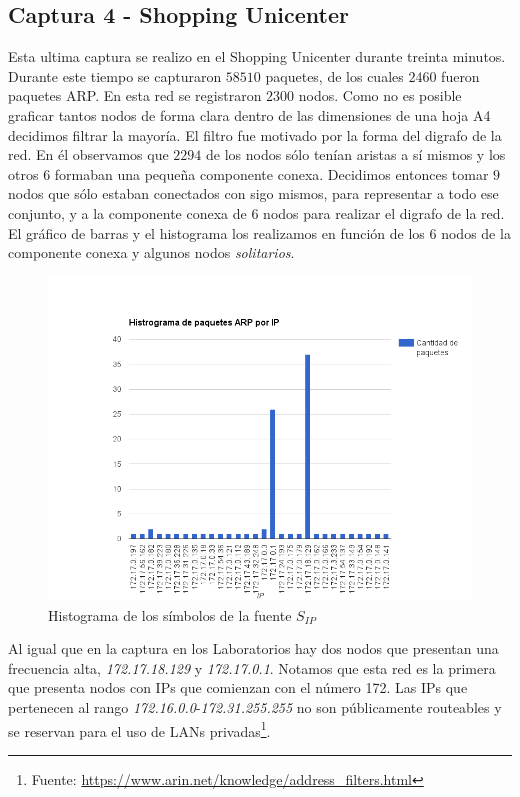 \subsection{Captura 4 - Shopping Unicenter}

Esta ultima captura se realizo en el Shopping Unicenter durante treinta minutos. Durante este tiempo se capturaron $58510$ paquetes, de los cuales $2460$ fueron paquetes ARP.
En esta red se registraron $2300$ nodos. Como no es posible graficar tantos nodos de forma clara dentro de las dimensiones de una hoja A4 decidimos filtrar la mayoría.
El filtro fue motivado por la forma del digrafo de la red. En él observamos que $2294$ de los nodos sólo tenían aristas a sí mismos y los otros $6$ formaban una pequeña componente conexa.
Decidimos entonces tomar $9$ nodos que sólo estaban conectados con sigo mismos, para representar a todo ese conjunto, y a la componente conexa de $6$ nodos para realizar el digrafo de la red.
El gráfico de barras y el histograma los realizamos en función de los $6$ nodos de la componente conexa y algunos nodos \textit{solitarios}.

\begin{figure}[H]
  \centering
    \includegraphics[width=1.1\textwidth]{imagenes/unicenter/histograma.png}
    \caption{Histograma de los símbolos de la fuente $S_{IP}$}
  \label{fig:ejemplo}
\end{figure}

Al igual que en la captura en los Laboratorios hay dos nodos que presentan una frecuencia alta, \textit{172.17.18.129} y \textit{172.17.0.1}. Notamos que esta red es la primera
que presenta nodos con IPs que comienzan con el número 172. Las IPs que pertenecen al rango \textit{172.16.0.0}-\textit{172.31.255.255} no son públicamente routeables y se reservan para el
uso de LANs privadas\footnote{Fuente: \url{https://www.arin.net/knowledge/address_filters.html}}.

